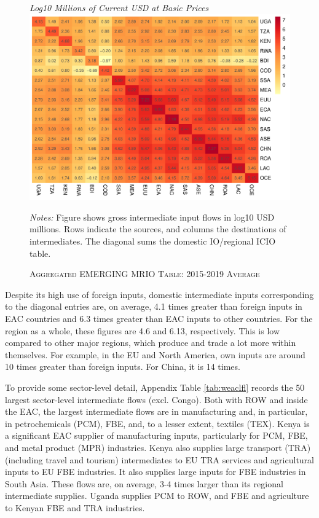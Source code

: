 \documentclass[a4paper]{article}
\begin{document}
\begin{figure}[h!] 
\centering
\caption{\label{fig:wld}\textsc{Aggregated EMERGING MRIO Table: 2015-2019 Average}}
\small{\textit{Log10 Millions of Current USD at Basic Prices}}
\includegraphics[width=1\textwidth, trim= {0 0 0 0}, clip]{"Figures/EM_heatmap_2015_19_AG.pdf"} \\ 
\raggedright
\scriptsize
\emph{Notes:} Figure shows gross intermediate input flows in log10 USD millions. Rows indicate the sources, and columns the destinations of intermediates. The diagonal sums the domestic IO/regional ICIO table. 
\end{figure}
\FloatBarrier

Despite its high use of foreign inputs, domestic intermediate inputs corresponding to the diagonal entries are, on average, 4.1 times greater than foreign inputs in EAC countries and 6.3 times greater than EAC inputs to other countries. For the region as a whole, these figures are 4.6 and 6.13, respectively. This is low compared to other major regions, which produce and trade a lot more within themselves. For example, in the EU and North America, own inputs are around 10 times greater than foreign inputs. For China, it is 14 times. \newline

To provide some sector-level detail, Appendix Table \ref{tab:weaclfl} records the 50 largest sector-level intermediate flows (excl. Congo). Both with ROW and inside the EAC, the largest intermediate flows are in manufacturing and, in particular, in petrochemicals (PCM), FBE, and, to a lesser extent, textiles (TEX). Kenya is a significant EAC supplier of manufacturing inputs, particularly for PCM, FBE, and metal product (MPR) industries. Kenya also supplies large transport (TRA) (including travel and tourism) intermediates to EU TRA services and agricultural inputs to EU FBE industries. It also supplies large inputs for FBE industries in South Asia. These flows are, on average, 3-4 times larger than its regional intermediate supplies. Uganda supplies PCM to ROW, and FBE and agriculture to Kenyan FBE and TRA industries. 
\end{document}

